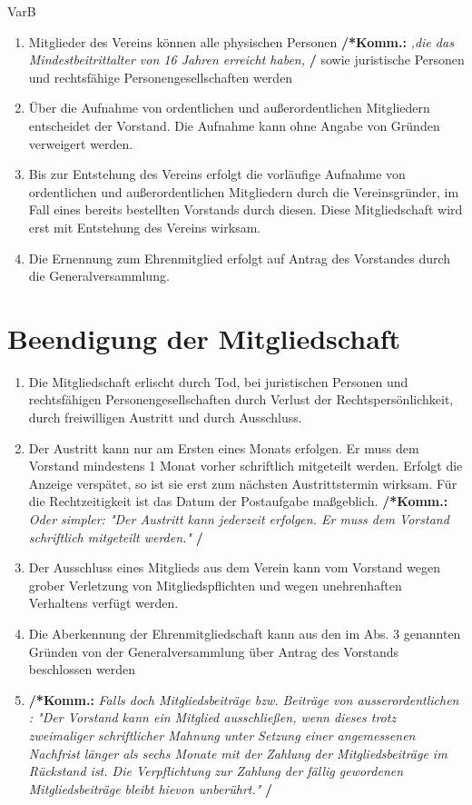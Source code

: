 \documentclass[a4paper,12pt]{article}
\newcommand{\comment}[1]{{\bf /*Komm.:} \textit{#1} {\bf */}}
\begin{document}
VarB
\begin{enumerate}
\item Mitglieder des Vereins können alle physischen Personen
\comment{,die das Mindestbeitrittalter von 16 Jahren erreicht haben,}
sowie juristische Personen und rechtsfähige Personengesellschaften werden

\item Über die Aufnahme von ordentlichen und außerordentlichen Mitgliedern entscheidet der Vorstand. Die Aufnahme kann ohne Angabe von Gründen verweigert werden. 

\item Bis zur Entstehung des Vereins erfolgt die vorläufige Aufnahme von ordentlichen und außerordentlichen Mitgliedern durch die Vereinsgründer, im Fall eines bereits bestellten Vorstands durch diesen. Diese Mitgliedschaft wird erst mit Entstehung des Vereins wirksam.

\item  Die Ernennung zum Ehrenmitglied erfolgt auf Antrag des Vorstandes durch die Generalversammlung.

\end{enumerate}

\section{Beendigung der Mitgliedschaft} %
\begin{enumerate}
\item Die Mitgliedschaft erlischt durch Tod, bei juristischen Personen und rechtsfähigen Personengesellschaften durch Verlust der Rechtspersönlichkeit, durch freiwilligen Austritt und durch Ausschluss.

\item Der Austritt kann nur am Ersten eines Monats erfolgen. Er muss dem Vorstand mindestens 1 Monat vorher schriftlich mitgeteilt werden. Erfolgt die Anzeige verspätet, so ist sie erst zum nächsten Austrittstermin wirksam. Für die Rechtzeitigkeit ist das Datum der Postaufgabe maßgeblich.
\comment{Oder simpler: "Der Austritt kann jederzeit erfolgen. Er muss dem Vorstand schriftlich mitgeteilt werden." }

\item Der Ausschluss eines Mitglieds aus dem Verein kann vom Vorstand wegen grober Verletzung von Mitgliedspflichten und wegen unehrenhaften Verhaltens verfügt werden.
\item Die Aberkennung der Ehrenmitgliedschaft kann aus den im Abs. 3 genannten Gründen von der Generalversammlung über Antrag des Vorstands beschlossen werden

\item \comment{Falls doch Mitgliedsbeiträge bzw. Beiträge von ausserordentlichen : "Der Vorstand kann ein Mitglied ausschließen, wenn dieses trotz zweimaliger schriftlicher Mahnung unter Setzung einer angemessenen Nachfrist länger als sechs Monate mit der Zahlung der Mitgliedsbeiträge im Rückstand ist. Die Verpflichtung zur Zahlung der fällig gewordenen Mitgliedsbeiträge bleibt hievon unberührt."}

\end{enumerate}
\end{document}
